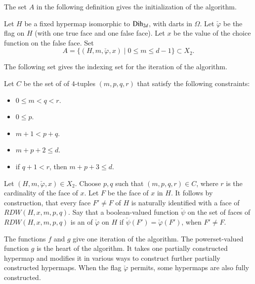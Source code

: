 The set $A$ in the following definition gives the initialization of the algorithm.

\begin{definition}[A]
Let $H$ be a fixed hypermap isomorphic to ${\operatorname{Dih}}_{2d}$, with darts in $\Omega$.
Let $\check\varphi$ be the flag on $H$ (with one true face and one
false face).  Let $x$ be the value of the choice function on the false
face.  Set
\begin{displaymath}
A = \{(H,m,\check\varphi,x) \mid 0\le m \le d-1\} \subset X_2.
\end{displaymath}
\end{definition}

The following set gives the indexing set for the iteration of the algorithm.

\begin{definition}[C]
Let $C$ be the set of of $4$-tuples $(m,p,q,r)$ that satisfy the following
constraints:
\begin{itemize}
\item $0\le m < q < r$.
\item $0\le p$.
\item $m+1 < p+q$.
\item $m+p+2 \le d$.
\item if $q+1< r$, then $m+p+3\le d$.
\end{itemize}
\end{definition}

\begin{definition}[extension]  
  Let $(H,m,\check\varphi,x)\in X_2$.  Choose $p,q$ such that $(m,p,q,r)\in
  C$, where $r$ is the cardinality of the face of $x$.  Let $F$ be the
  face of $x$ in $H$.  It follows by construction, that every face
  $F'\ne F$ of $H$ is naturally identified with a face of
  $RDW(H,x,m,p,q)$.  Say that a boolean-valued function $\check\psi$ on the
  set of faces of $RDW(H,x,m,p,q)$ is an  of
  $\check\varphi$ on $H$ if $\check\psi(F') =\check\varphi(F')$, when $F'\ne F$.
\end{definition}


The functions $f$ and $g$ give one iteration of the algorithm.  The
powerset-valued function $g$ is the heart of the algorithm.  It takes
one partially constructed hypermap and modifies it in various ways to
construct further partially constructed hypermaps.  When the flag
$\check\varphi$ permits, some hypermaps are also fully constructed.


